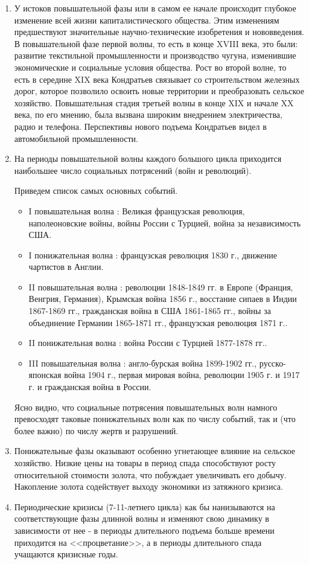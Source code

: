 \documentclass[a4paper,14pt]{extarticle}
\begin{document}
 	\begin{enumerate}
 		\item У истоков повышательной фазы или в самом ее начале происходит глубокое изменение всей жизни капиталистического общества. Этим изменениям предшествуют значительные научно-технические изобретения и нововведения. В повышательной фазе первой волны, то есть в конце XVIII века, это были: развитие текстильной промышленности и производство чугуна, изменившие экономические и социальные условия общества. Рост во второй волне, то есть в середине XIX века Кондратьев связывает со строительством железных дорог, которое позволило освоить новые территории и преобразовать сельское хозяйство. Повышательная стадия третьей волны в конце XIX и начале XX века, по его мнению, была вызвана широким внедрением электричества, радио и телефона. Перспективы нового подъема Кондратьев видел в автомобильной промышленности.
 		\item На периоды повышательной волны каждого большого цикла приходится наибольшее число социальных потрясений (войн и революций).
 		
 		Приведем список самых основных событий.
 		
 		\begin{itemize}
 			\item I повышательная волна : Великая французская революция, наполеоновские войны, войны России с Турцией, война за независимость США.
 			\item I понижательная волна : французская революция 1830 г., движение чартистов в Англии.
 			\item II повышательная волна : революции 1848-1849 гг. в Европе (Франция, Венгрия, Германия), Крымская война 1856 г., восстание сипаев в Индии 1867-1869 гг., гражданская война в США 1861-1865 гг., войны за объединение Германии 1865-1871 гг., французская революция 1871 г..
 			\item II понижательная волна : война России с Турцией 1877-1878 гг..
 			\item III повышательная волна : англо-бурская война 1899-1902 гг., русско-японская война 1904 г., первая мировая война, революции 1905 г. и 1917 г. и гражданская война в России.
 		\end{itemize}
 		
 		Ясно видно, что социальные потрясения повышательных волн намного превосходят таковые понижательных волн как по числу событий, так и (что более важно) по числу жертв и разрушений.
 		
 		\item Понижательные фазы оказывают особенно угнетающее влияние на сельское хозяйство. Низкие цены на товары в период спада способствуют росту относительной стоимости золота, что побуждает увеличивать его добычу. Накопление золота содействует выходу экономики из затяжного кризиса.
 		
 		\item Периодические кризисы (7-11-летнего цикла) как бы нанизываются на соответствующие фазы длинной волны и изменяют свою динамику в зависимости от нее - в периоды длительного подъема больше времени приходится на <<процветание>>, а в периоды длительного спада учащаются кризисные годы.
 	\end{enumerate}
 	
\end{document}

